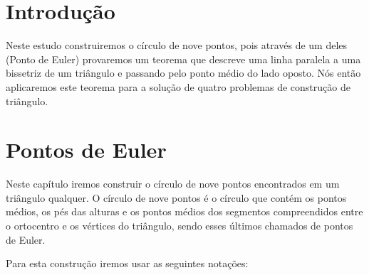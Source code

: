 \documentclass[12pt, openright, a4paper, brazil, openany, oneside]{abntex2}
\begin{document}


\frenchspacing 


\imprimircapa

\imprimirfolhaderosto*

\ABNTEXchapterfont

\tableofcontents*
\cleardoublepage
\textual

\chapter*[Introdução]{Introdução}


Neste estudo construiremos o círculo de nove pontos, pois através de um deles (Ponto de Euler) provaremos um teorema que descreve uma linha paralela a uma bissetriz de um triângulo e passando pelo ponto médio do lado oposto. Nós então aplicaremos este teorema para a solução de quatro problemas de construção de triângulo.



\chapter{Pontos de Euler}

Neste capítulo iremos construir o círculo de nove pontos encontrados em um triângulo qualquer. O círculo de nove pontos é o círculo que contém os pontos médios, os pés das alturas e os pontos médios dos segmentos compreendidos entre o ortocentro e os vértices do triângulo, sendo esses últimos chamados de pontos de Euler.

Para esta construção iremos usar as seguintes notações:
\end{document}
